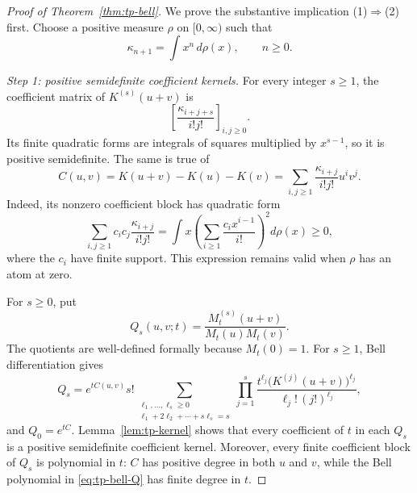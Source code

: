 \documentclass[11pt,a4paper]{article}
\theoremstyle{definition}
\theoremstyle{remark}
\numberwithin{equation}{section}
\begin{document}
\begin{proof}[Proof of Theorem~\ref{thm:tp-bell}]
We prove the substantive implication (1)$\Rightarrow$(2) first.  Choose a
positive measure $\rho$ on $[0,\infty)$ such that
\begin{equation}
 \kappa_{n+1}=\int x^n\,d\rho(x),\qquad n\geq0.
 \label{eq:tp-cumulant-measure}
\end{equation}

\smallskip\noindent
\emph{Step 1: positive semidefinite coefficient kernels.}
For every integer $s\geq1$, the coefficient matrix of $K^{(s)}(u+v)$ is
\[
 \left[\frac{\kappa_{i+j+s}}{i!j!}\right]_{i,j\geq0}.
\]
Its finite quadratic forms are integrals of squares multiplied by
$x^{s-1}$, so it is positive semidefinite.  The same is true of
\begin{equation}
 C(u,v)=K(u+v)-K(u)-K(v)
       =\sum_{i,j\geq1}\frac{\kappa_{i+j}}{i!j!}u^iv^j.
 \label{eq:tp-centered-kernel}
\end{equation}
Indeed, its nonzero coefficient block has quadratic form
\[
 \sum_{i,j\geq1}c_ic_j\frac{\kappa_{i+j}}{i!j!}
 =\int x\left(\sum_{i\geq1}\frac{c_i x^{i-1}}{i!}\right)^2d\rho(x)
 \geq0,
\]
where the $c_i$ have finite support.  This expression remains valid when
$\rho$ has an atom at zero.

For $s\geq0$, put
\begin{equation}
 Q_s(u,v;t)=\frac{M_t^{(s)}(u+v)}{M_t(u)M_t(v)}.
 \label{eq:tp-Q}
\end{equation}
The quotients are well-defined formally because $M_t(0)=1$.
For $s\geq1$, Bell differentiation gives
\begin{equation}
 Q_s=e^{tC(u,v)}s!
 \sum_{\substack{\ell_1,\ldots,\ell_s\geq0\\
                   \ell_1+2\ell_2+\cdots+s\ell_s=s}}
 \prod_{j=1}^s
 \frac{t^{\ell_j}\bigl(K^{(j)}(u+v)\bigr)^{\ell_j}}
      {\ell_j!\,(j!)^{\ell_j}},
 \label{eq:tp-bell-Q}
\end{equation}
and $Q_0=e^{tC}$.  Lemma~\ref{lem:tp-kernel} shows that every coefficient
of $t$ in each $Q_s$ is a positive semidefinite coefficient kernel.
Moreover, every finite coefficient block of $Q_s$ is polynomial in $t$:
$C$ has positive degree in both $u$ and $v$, while the Bell polynomial in
\eqref{eq:tp-bell-Q} has finite degree in $t$.


\end{proof}
\end{document}
